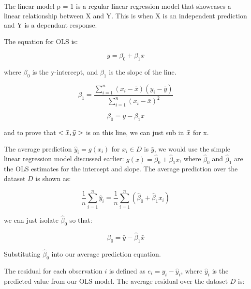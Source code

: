 \documentclass[12pt]{article}
\begin{document}
\begin{enumerate}


The linear model p = 1 is a regular linear regression model that showcases a linear relationship between X and Y. This is when X is an independent prediction and Y is a dependant response.


The equation for OLS is:

\[
y = \beta_0 + \beta_1 x
\]

where \(\beta_0\) is the y-intercept, and \(\beta_1\) is the slope of the line. 

\[
\beta_1 = \frac{\sum_{i=1}^{n} (x_i - \bar{x})(y_i - \bar{y})}{\sum_{i=1}^{n} (x_i - \bar{x})^2}
\]

\[
\beta_0 = \bar{y} - \beta_1 \bar{x}
\]

and to prove that $<\bar{x}, \bar{y}>$ is on this line, we can just sub in $\Bar{x}$ for x.


The average prediction \(\hat{y}_i = g(x_i)\) for \(x_i \in D\) is \(\bar{y}\), we would use the simple linear regression model discussed earlier: \(g(x) = \hat{\beta}_0 + \hat{\beta}_1x\), where \(\hat{\beta}_0\) and \(\hat{\beta}_1\) are the OLS estimates for the intercept and slope. The average prediction over the dataset \(D\) is shown as:

\[
\frac{1}{n} \sum_{i=1}^{n} \hat{y}_i = \frac{1}{n} \sum_{i=1}^{n} (\hat{\beta}_0 + \hat{\beta}_1x_i)
\]

we can just isolate \(\hat{\beta}_0\) so that:

\[
\hat{\beta}_0 = \bar{y} - \hat{\beta}_1\bar{x}
\]

Substituting \(\hat{\beta}_0\) into our average prediction equation.



The residual for each observation \(i\) is defined as \(e_i = y_i - \hat{y}_i\), where \(\hat{y}_i\) is the predicted value from our OLS model. The average residual over the dataset \(D\) is:


\end{enumerate}
\end{document}
